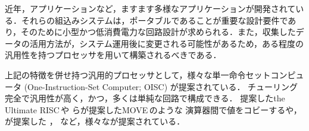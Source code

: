 \documentclass[12pt,landscape]{ltjtarticle}
\begin{document}
近年，アプリケーションなど，ますます多様なアプリケーションが開発されている．それらの組込みシステムは，ポータブルであることが重要な設計要件であり，そのために小型かつ低消費電力な回路設計が求められる．また，収集したデータの活用方法が，システム運用後に変更される可能性があるため，ある程度の汎用性を持つプロセッサを用いて構築されるべきである．

上記の特徴を併せ持つ汎用的プロセッサとして，様々な単一命令セットコンピュータ (One-Instruction-Set Computer; OISC) が提案されている．
チューリング完全で汎用性が高く，かつ，多くは単純な回路で構成できる．
提案した\JAspace the Ultimate RISC\,\cite{Jones1988}\AJspace や
らが提案した\JAspace MOVE\,\cite{Corporaal1991,Corporaal1993}\AJspace のような
演算器間で値をコビーするや，%
が提案した%
\cite{Mazonka2009}，
など，様々なが提案されている．
\end{document}
